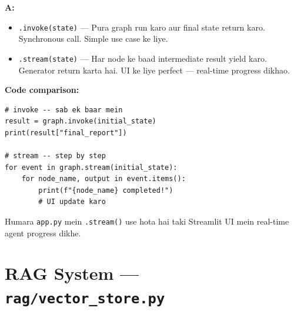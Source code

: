 \documentclass[12pt, a4paper]{article}
\begin{document}
\begin{interviewbox}[title={\faIcon{user-tie} ~Q: \texttt{.invoke()} vs \texttt{.stream()} mein kya fark hai?}]
\textbf{A:}
\begin{itemize}
\item \texttt{.invoke(state)} --- Pura graph run karo aur final state return karo. Synchronous call. Simple use case ke liye.
\item \texttt{.stream(state)} --- Har node ke baad intermediate result yield karo. Generator return karta hai. UI ke liye perfect --- real-time progress dikhao.
\end{itemize}

\textbf{Code comparison:}
\begin{lstlisting}[style=pythonstyle]
# invoke -- sab ek baar mein
result = graph.invoke(initial_state)
print(result["final_report"])

# stream -- step by step
for event in graph.stream(initial_state):
    for node_name, output in event.items():
        print(f"{node_name} completed!")
        # UI update karo
\end{lstlisting}

Humara \texttt{app.py} mein \texttt{.stream()} use hota hai taki Streamlit UI mein real-time agent progress dikhe.
\end{interviewbox}


\newpage
\section{RAG System --- \texttt{rag/vector\_store.py}}
\end{document}
